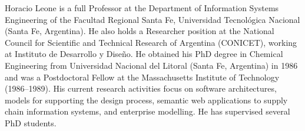 \documentclass[journal]{IEEEtran}
\begin{document}
\begin{IEEEbiography}{Horacio Leone}
is a full Professor at the Department of Information Systems Engineering of the Facultad Regional Santa Fe, Universidad Tecnológica Nacional (Santa Fe, Argentina). He also holds a Researcher position at the National Council for Scientific and Technical Research of Argentina (CONICET), working at Instituto de Desarrollo y Diseño. He obtained his PhD degree in Chemical Engineering from Universidad Nacional del Litoral (Santa Fe, Argentina) in 1986 and was a Postdoctoral Fellow at the Massachusetts Institute of Technology (1986–1989). His current research activities focus on software architectures, models for supporting the design process, semantic web applications to supply chain information systems, and enterprise modelling. He has supervised several PhD students.
\end{IEEEbiography}






\end{document}
